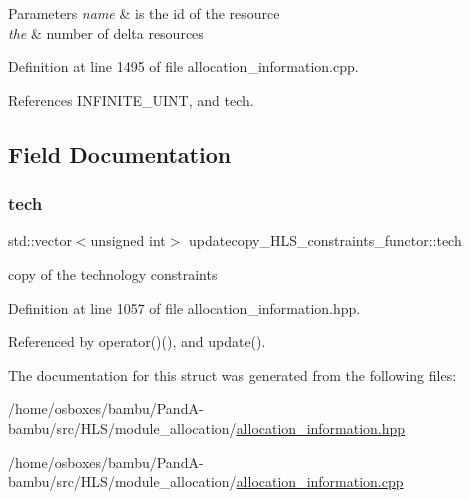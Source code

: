 \begin{DoxyParams}{Parameters}
{\em name} & is the id of the resource \\
\hline
{\em the} & number of delta resources \\
\hline
\end{DoxyParams}


Definition at line 1495 of file allocation\+\_\+information.\+cpp.



References I\+N\+F\+I\+N\+I\+T\+E\+\_\+\+U\+I\+NT, and tech.



\subsection{Field Documentation}
\mbox{\label{structupdatecopy__HLS__constraints__functor_a220fee7790fcb46f07aed9f914765954}} 
\subsubsection{\texorpdfstring{tech}{tech}}
{\footnotesize\ttfamily std\+::vector$<$unsigned int$>$ updatecopy\+\_\+\+H\+L\+S\+\_\+constraints\+\_\+functor\+::tech\hspace{0.3cm}{\ttfamily [private]}}



copy of the technology constraints 



Definition at line 1057 of file allocation\+\_\+information.\+hpp.



Referenced by operator()(), and update().



The documentation for this struct was generated from the following files\+:\begin{DoxyCompactItemize}
\item 
/home/osboxes/bambu/\+Pand\+A-\/bambu/src/\+H\+L\+S/module\+\_\+allocation/\hyperlink{allocation__information_8hpp}{allocation\+\_\+information.\+hpp}\item 
/home/osboxes/bambu/\+Pand\+A-\/bambu/src/\+H\+L\+S/module\+\_\+allocation/\hyperlink{allocation__information_8cpp}{allocation\+\_\+information.\+cpp}\end{DoxyCompactItemize}
